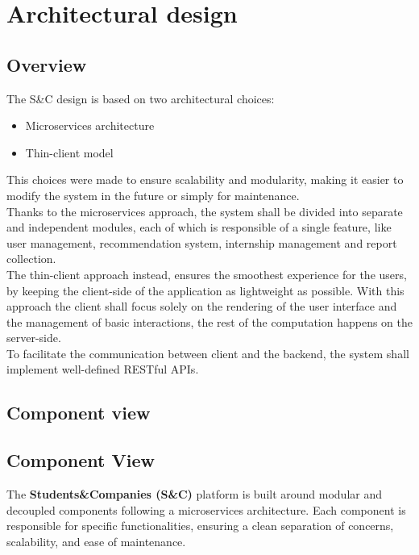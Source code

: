 \documentclass[11pt,twoside]{article}
\begin{document}
\newpage

\section{Architectural design}
	\subsection{Overview}
The S\&C design is based on two architectural choices:
\begin{itemize}
\item Microservices architecture
\item Thin-client model
\end{itemize}
This choices were made to ensure scalability and modularity, making it easier to modify the system in the future or simply for maintenance.\\
Thanks to the microservices approach, the system shall be divided into separate and independent modules, each of which is responsible of a single feature, like user management, recommendation system, internship management and report collection.\\
The thin-client approach instead, ensures the smoothest experience for the users, by keeping the client-side of the application as lightweight as possible. With this approach the client shall focus solely on the rendering of the user interface and the management of basic interactions, the rest of the computation happens on the server-side.\\
To facilitate the communication between client and the backend, the system shall implement well-defined RESTful APIs.

	\subsection{Component view}
\subsection{Component View}

The \textbf{Students\&Companies (S\&C)} platform is built around modular and decoupled components following a microservices architecture. Each component is responsible for specific functionalities, ensuring a clean separation of concerns, scalability, and ease of maintenance.
\end{document}

